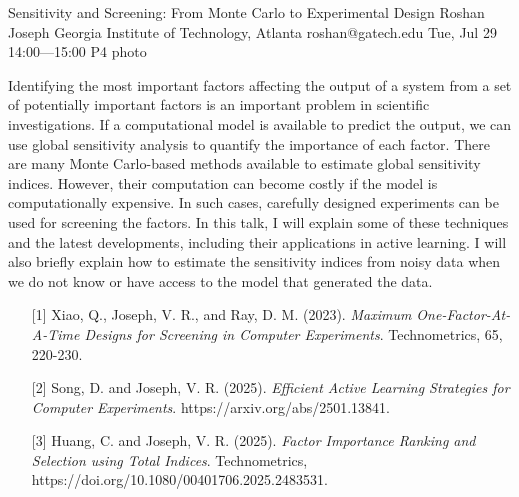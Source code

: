 \clearpage
\begin{talk}
  {Sensitivity and Screening: From Monte Carlo to Experimental Design}%
  {Roshan Joseph}%
  {Georgia Institute of Technology, Atlanta}%
  {roshan@gatech.edu}%
  {}%
  {}%
  {Tue, Jul 29 14:00---15:00}%
  {P4}%
  {photo}%
  
    
   
Identifying the most important factors affecting the output of a system from a set of potentially important factors is an important problem in scientific investigations. If a computational model is available to predict the output, we can use global sensitivity analysis to quantify the importance of each factor. There are many Monte Carlo-based methods available to estimate global sensitivity indices. However, their computation can become costly if the model is computationally expensive. In such cases, carefully designed experiments can be used for screening the factors. In this talk, I will explain some of these techniques and the latest developments, including their applications in active learning. I will also briefly explain how to estimate the sensitivity indices from noisy data when we do not know or have access to the model that generated the data.
\medskip

\begin{enumerate}
 \item[{[1]}] Xiao, Q., Joseph, V. R., and Ray, D. M. (2023). {\it Maximum One-Factor-At-A-Time  Designs for Screening in Computer Experiments}. Technometrics, 65, 220-230.
    \item[{[2]}] Song, D. and Joseph, V. R. (2025). {\it Efficient Active Learning Strategies for Computer Experiments}. https://arxiv.org/abs/2501.13841.
 \item[{[3]}] Huang, C. and Joseph, V. R. (2025). {\it Factor Importance Ranking and Selection using Total Indices}. Technometrics, https://doi.org/10.1080/00401706.2025.2483531.
\end{enumerate}

\end{talk}

